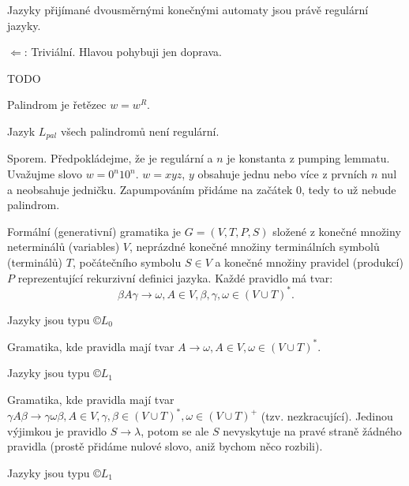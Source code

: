 \documentclass[12pt]{article}                   %
\begin{document}
    \begin{veta}
        Jazyky přijímané dvousměrnými konečnými automaty jsou právě regulární jazyky.

        \begin{dukazin}
            $\Leftarrow$: Triviální. Hlavou pohybuji jen doprava.
            
            TODO
        \end{dukazin}
    \end{veta}


    \begin{definice}[Palindrom]
        Palindrom je řetězec $w = w^R$.
    \end{definice}

    \begin{lemma}
        Jazyk $L_{pal}$ všech palindromů  není regulární.

        \begin{dukazin}
            Sporem. Předpokládejme, že je regulární a $n$ je konstanta z pumping lemmatu. Uvažujme slovo $w = 0^n 1 0^n$. $w=xyz$, $y$ obsahuje jednu nebo více z prvních $n$ nul a neobsahuje jedničku. Zapumpováním přidáme na začátek 0, tedy to už nebude palindrom.
        \end{dukazin}
    \end{lemma}

    \begin{definice}
        Formální (generativní) gramatika je $G = (V, T, P, S)$ složené z konečné množiny neterminálů (variables) $V$, neprázdné konečné množiny terminálních symbolů (terminálů) $T$, počátečního symbolu $S \in V$ a konečné množiny pravidel (produkcí) $P$ reprezentující rekurzivní definici jazyka. Každé pravidlo má tvar:
        $$ \beta A\gamma \rightarrow \omega, A \in V, \beta, \gamma, \omega \in (V \cup T)^*. $$

        Jazyky jsou typu $©L_0$
    \end{definice}

    \begin{definice}
        Gramatika, kde pravidla mají tvar $A \rightarrow \omega, A \in V, \omega \in (V \cup T)^*$.

        Jazyky jsou typu $©L_1$
    \end{definice}

    \begin{definice}
        Gramatika, kde pravidla mají tvar $\gamma A\beta \rightarrow \gamma\omega\beta, A \in V, \gamma, \beta \in (V \cup T)^*, \omega \in (V \cup T)^+$ (tzv. nezkracující). Jedinou výjimkou je pravidlo $S \rightarrow \lambda$, potom se ale $S$ nevyskytuje na pravé straně žádného pravidla (prostě přidáme nulové slovo, aniž bychom něco rozbili).

        Jazyky jsou typu $©L_1$
    \end{definice}
\end{document}
